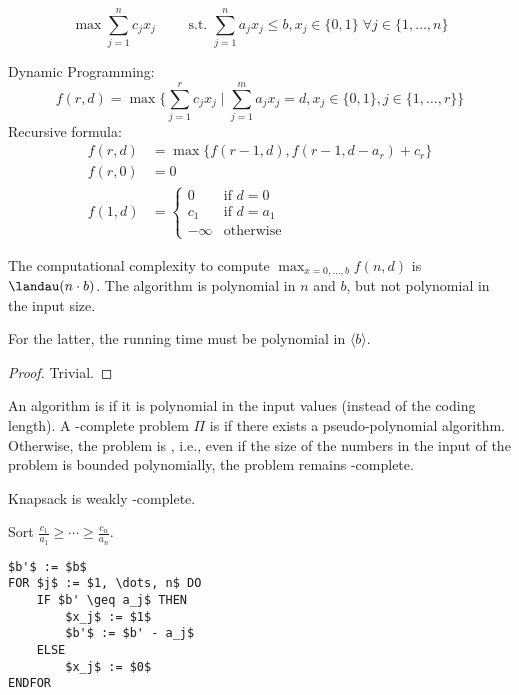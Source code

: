 \begin{lec}[2011-01-30]\end{lec}


\[
	\max \sum_{j=1}^n c_j x_j \qquad \text{ s.t. } \sum_{j=1}^n a_j x_j \leq b,
	x_j \in \{0,1\} \;\forall j \in \{1, \dots, n\}
\]

Dynamic Programming:
\[
	f(r, d) = \max\{ \sum_{j=1}^r c_j x_j \mid \sum_{j=1}^m a_j x_j = d, x_j
	\in \{0,1\}, j \in \{1, \dots, r\} \}
\]
Recursive formula:
\begin{align*}
f(r,d) &= \max\{ f(r-1, d), f(r-1, d-a_r) + c_r \} \\
f(r,0) &= 0 \\
f(1,d) &= \begin{cases}0 &\text{if } d = 0\\ c_1 &\text{if } d = a_1 \\
-\infty &\text{otherwise}\end{cases}
\end{align*}

\begin{thm}\label{thm:thm26.1}
The computational complexity to compute $\max_{x=0,\dots,b} f(n,d)$ is
$\landau(n \cdot b)$. The algorithm is polynomial in $n$ and $b$, but
not polynomial in the input size.

For the latter, the running time must be polynomial in $\langle b \rangle$.
\end{thm}
\begin{proof}
Trivial.
\end{proof}

\begin{defn}\label{def:defn26.2}
An algorithm is  if it is
polynomial in the input values (instead of the coding length).
A \npoly-complete problem $\Pi$ is  if there exists a pseudo-polynomial algorithm. Otherwise,
the problem is , i.e., even
if the size of the numbers in the input of the problem is bounded
polynomially, the problem remains \npoly-complete.
\end{defn}

\begin{cor}\label{cor:cor26.3}
Knapsack is weakly \npoly-complete.
\end{cor}

Sort $\frac{c_1}{a_1} \geq \cdots \geq \frac{c_n}{a_n}$.
\begin{lstlisting}[caption=Greedy algorithm]
$b'$ := $b$
FOR $j$ := $1, \dots, n$ DO
	IF $b' \geq a_j$ THEN
		$x_j$ := $1$
		$b'$ := $b' - a_j$
	ELSE
		$x_j$ := $0$
ENDFOR
\end{lstlisting}

